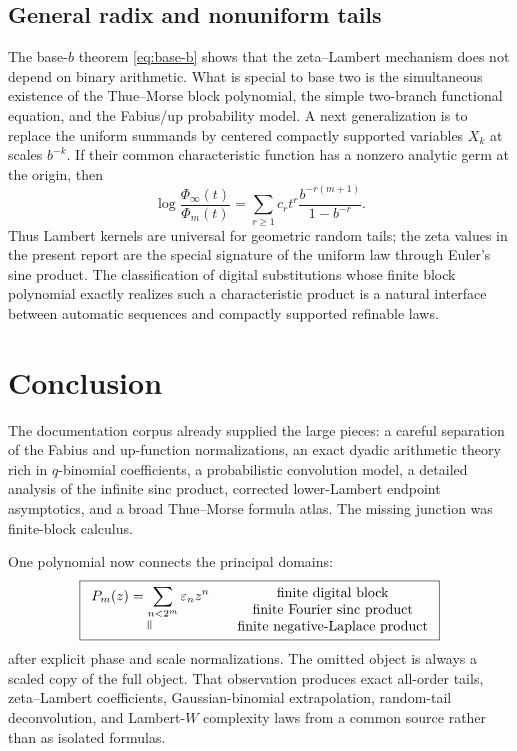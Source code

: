 \documentclass[11pt,oneside]{article}
\numberwithin{equation}{section}
\theoremstyle{definition}
\theoremstyle{remark}
\newcommand{\eps}{\varepsilon}
\begin{document}
\subsection{General radix and nonuniform tails}

The base-$b$ theorem \eqref{eq:base-b} shows that the zeta--Lambert mechanism does not depend
on binary arithmetic.  What is special to base two is the simultaneous existence of the
Thue--Morse block polynomial, the simple two-branch functional equation, and the Fabius/up
probability model.  A next generalization is to replace the uniform summands by centered
compactly supported variables $X_k$ at scales $b^{-k}$.  If their common characteristic
function has a nonzero analytic germ at the origin, then
\[
 \log\frac{\Phi_\infty(t)}{\Phi_m(t)}
 =\sum_{r\ge1}c_r t^r\frac{b^{-r(m+1)}}{1-b^{-r}}.
\]
Thus Lambert kernels are universal for geometric random tails; the zeta values in the present
report are the special signature of the uniform law through Euler's sine product.  The
classification of digital substitutions whose finite block polynomial exactly realizes such
a characteristic product is a natural interface between automatic sequences and compactly
supported refinable laws.

\section{Conclusion}
\label{sec:conclusion}

The documentation corpus already supplied the large pieces: a careful separation of the
Fabius and up-function normalizations, an exact dyadic arithmetic theory rich in
$q$-binomial coefficients, a probabilistic convolution model, a detailed analysis of the
infinite sinc product, corrected lower-Lambert endpoint asymptotics, and a broad Thue--Morse
formula atlas.  The missing junction was finite-block calculus.

One polynomial now connects the principal domains:
\[
 \boxed{
 \begin{array}{c}
 P_m(z)=\displaystyle\sum_{n<2^m}\eps_nz^n\\[0.3em]
 \rotatebox{90}{$=$}
 \end{array}
 \quad
 \begin{array}{c}
 \text{finite digital block}\\
 \text{finite Fourier sinc product}\\
 \text{finite negative-Laplace product}
 \end{array}}
\]
after explicit phase and scale normalizations.  The omitted object is always a scaled copy of
the full object.  That observation produces exact all-order tails, zeta--Lambert coefficients,
Gaussian-binomial extrapolation, random-tail deconvolution, and Lambert-$W$ complexity laws
from a common source rather than as isolated formulas.
\end{document}
